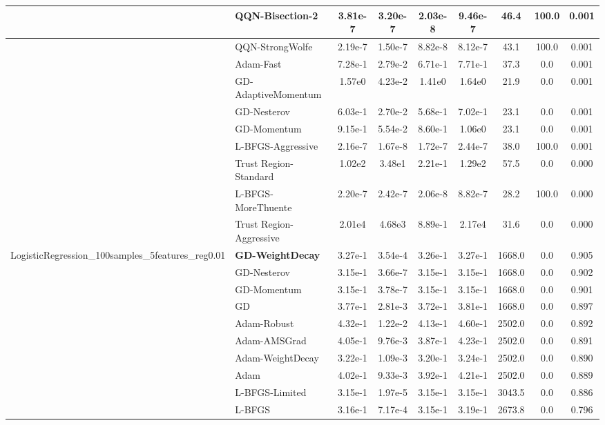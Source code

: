 \documentclass{article}
\begin{document}
\begin{longtable}{|l|l|c|c|c|c|c|c|c|}
\hline
 & QQN-Bisection-2 & 3.81e-7 & 3.20e-7 & 2.03e-8 & 9.46e-7 & 46.4 & 100.0 & 0.001 \\
\hline
 & QQN-StrongWolfe & 2.19e-7 & 1.50e-7 & 8.82e-8 & 8.12e-7 & 43.1 & 100.0 & 0.001 \\
\hline
 & Adam-Fast & 7.28e-1 & 2.79e-2 & 6.71e-1 & 7.71e-1 & 37.3 & 0.0 & 0.001 \\
\hline
 & GD-AdaptiveMomentum & 1.57e0 & 4.23e-2 & 1.41e0 & 1.64e0 & 21.9 & 0.0 & 0.001 \\
\hline
 & GD-Nesterov & 6.03e-1 & 2.70e-2 & 5.68e-1 & 7.02e-1 & 23.1 & 0.0 & 0.001 \\
\hline
 & GD-Momentum & 9.15e-1 & 5.54e-2 & 8.60e-1 & 1.06e0 & 23.1 & 0.0 & 0.001 \\
\hline
 & L-BFGS-Aggressive & 2.16e-7 & 1.67e-8 & 1.72e-7 & 2.44e-7 & 38.0 & 100.0 & 0.001 \\
\hline
 & Trust Region-Standard & 1.02e2 & 3.48e1 & 2.21e-1 & 1.29e2 & 57.5 & 0.0 & 0.000 \\
\hline
 & L-BFGS-MoreThuente & 2.20e-7 & 2.42e-7 & 2.06e-8 & 8.82e-7 & 28.2 & 100.0 & 0.000 \\
\hline
 & Trust Region-Aggressive & 2.01e4 & 4.68e3 & 8.89e-1 & 2.17e4 & 31.6 & 0.0 & 0.000 \\
LogisticRegression\_100samples\_5features\_reg0.01 & \textbf{GD-WeightDecay} & 3.27e-1 & 3.54e-4 & 3.26e-1 & 3.27e-1 & 1668.0 & 0.0 & 0.905 \\
\hline
 & GD-Nesterov & 3.15e-1 & 3.66e-7 & 3.15e-1 & 3.15e-1 & 1668.0 & 0.0 & 0.902 \\
\hline
 & GD-Momentum & 3.15e-1 & 3.78e-7 & 3.15e-1 & 3.15e-1 & 1668.0 & 0.0 & 0.901 \\
\hline
 & GD & 3.77e-1 & 2.81e-3 & 3.72e-1 & 3.81e-1 & 1668.0 & 0.0 & 0.897 \\
\hline
 & Adam-Robust & 4.32e-1 & 1.22e-2 & 4.13e-1 & 4.60e-1 & 2502.0 & 0.0 & 0.892 \\
\hline
 & Adam-AMSGrad & 4.05e-1 & 9.76e-3 & 3.87e-1 & 4.23e-1 & 2502.0 & 0.0 & 0.891 \\
\hline
 & Adam-WeightDecay & 3.22e-1 & 1.09e-3 & 3.20e-1 & 3.24e-1 & 2502.0 & 0.0 & 0.890 \\
\hline
 & Adam & 4.02e-1 & 9.33e-3 & 3.92e-1 & 4.21e-1 & 2502.0 & 0.0 & 0.889 \\
\hline
 & L-BFGS-Limited & 3.15e-1 & 1.97e-5 & 3.15e-1 & 3.15e-1 & 3043.5 & 0.0 & 0.886 \\
\hline
 & L-BFGS & 3.16e-1 & 7.17e-4 & 3.15e-1 & 3.19e-1 & 2673.8 & 0.0 & 0.796 \\

\end{longtable}
\end{document}
